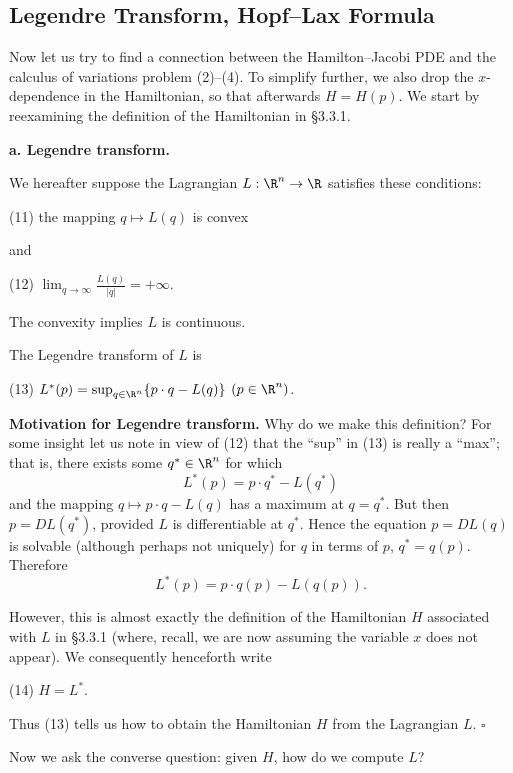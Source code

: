 \subsection{Legendre Transform, Hopf--Lax Formula}
\label{sec:legendre-transform-hopf-lax}

Now let us try to find a connection between the Hamilton--Jacobi PDE and the calculus of variations problem (2)--(4). To simplify further, we also drop the $x$-dependence in the Hamiltonian, so that afterwards $H = H(p)$. We start by reexamining the definition of the Hamiltonian in \S3.3.1.

\textbf{a. Legendre transform.}

We hereafter suppose the Lagrangian $L : \R^n \to \R$ satisfies these conditions:

(11) \qquad the mapping $q \mapsto L(q)$ is convex

and

(12) \qquad $\lim_{q \to \infty} \frac{L(q)}{|q|} = +\infty$.

The convexity implies $L$ is continuous.

\begin{definition}
\label{def:legendre-transform}
The Legendre transform of $L$ is

(13) \qquad $L^*(p) = \sup_{q \in \R^n} \{p \cdot q - L(q)\}$ \qquad $(p \in \R^n)$.
\end{definition}

\textbf{Motivation for Legendre transform.} Why do we make this definition? For some insight let us note in view of (12) that the ``sup'' in (13) is really a ``max''; that is, there exists some $q^* \in \R^n$ for which
$$L^*(p) = p \cdot q^* - L(q^*)$$
and the mapping $q \mapsto p \cdot q - L(q)$ has a maximum at $q = q^*$. But then $p = DL(q^*)$, provided $L$ is differentiable at $q^*$. Hence the equation $p = DL(q)$ is solvable (although perhaps not uniquely) for $q$ in terms of $p$, $q^* = q(p)$. Therefore
$$L^*(p) = p \cdot q(p) - L(q(p)).$$

However, this is almost exactly the definition of the Hamiltonian $H$ associated with $L$ in \S3.3.1 (where, recall, we are now assuming the variable $x$ does not appear). We consequently henceforth write

(14) \qquad $H = L^*$.

Thus (13) tells us how to obtain the Hamiltonian $H$ from the Lagrangian $L$.
$\square$

Now we ask the converse question: given $H$, how do we compute $L$?

